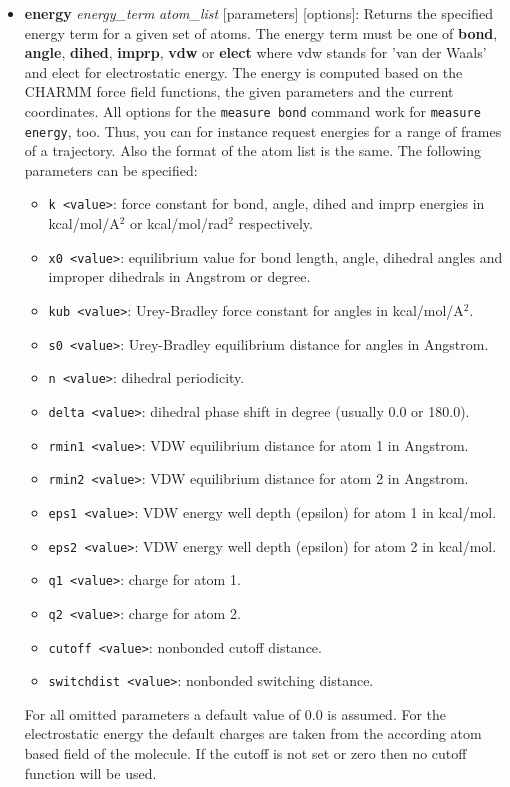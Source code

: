 \begin{itemize}
\item {\bf energy} {\it energy\_term} {\it atom\_list} [parameters] [options]:
  Returns the specified energy term for a given set of atoms. The energy term must be one of
  {\bf bond}, {\bf angle}, {\bf dihed}, {\bf imprp}, {\bf vdw} or {\bf elect} where
  vdw stands for 'van der Waals' and elect for electrostatic energy.
  The energy is computed based on the CHARMM force field functions,
  the given parameters and the current coordinates. All options for the {\tt measure bond}
  command work for {\tt measure energy}, too. Thus, you can for instance request energies
  for a range of frames of a trajectory. Also the format of the atom list is the same.
  The following parameters can be specified:
  \begin{itemize}
  \item {\tt k  <value>}: force constant for bond, angle, dihed and imprp energies in
     kcal/mol/A$^2$ or kcal/mol/rad$^2$ respectively.
  \item {\tt x0 <value>}: equilibrium value for bond length, angle, dihedral angles and
     improper dihedrals in Angstrom or degree.
  \item {\tt kub <value>}: Urey-Bradley force constant for angles in kcal/mol/A$^2$.
  \item {\tt s0 <value>}:  Urey-Bradley equilibrium distance for angles in Angstrom.
  \item {\tt n <value>}: dihedral periodicity.
  \item {\tt delta <value>}: dihedral phase shift in degree (usually 0.0 or 180.0).
  \item {\tt rmin1 <value>}: VDW equilibrium distance for atom 1 in Angstrom.
  \item {\tt rmin2 <value>}: VDW equilibrium distance for atom 2 in Angstrom.
  \item {\tt eps1 <value>}: VDW energy well depth (epsilon) for atom 1 in kcal/mol.
  \item {\tt eps2 <value>}: VDW energy well depth (epsilon) for atom 2 in kcal/mol.
  \item {\tt q1 <value>}: charge for atom 1.
  \item {\tt q2 <value>}: charge for atom 2.
  \item {\tt cutoff <value>}: nonbonded cutoff distance.
  \item {\tt switchdist <value>}: nonbonded switching distance.
  \end{itemize}
  For all omitted parameters a default value of 0.0 is assumed. 
  For the electrostatic energy the default charges are taken from the according
  atom based field of the molecule. If the cutoff is not set or zero then no cutoff
  function will be used.


\end{itemize}
